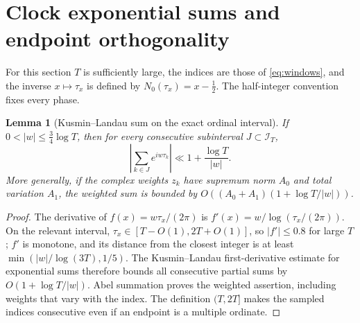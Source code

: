 \documentclass[11pt,reqno]{amsart}
\numberwithin{equation}{section}
\newtheorem{lemma}[theorem]{Lemma}
\begin{document}
\section{Clock exponential sums and endpoint orthogonality}\label{sec:clockorth}
For this section $T$ is sufficiently large, the indices are those of
\eqref{eq:windows}, and the inverse $x\mapsto\tau_x$ is defined by
$N_0(\tau_x)=x-\tfrac12$.  The half-integer convention fixes every phase.

\begin{lemma}[Kusmin--Landau sum on the exact ordinal interval]
\label{lem:klclock}
If $0<|w|\le\tfrac34\log T$, then for every consecutive subinterval
$J\subset\mathcal I_T$,
\begin{equation}\label{eq:klclock}
\left|\sum_{k\in J}e^{iw\tau_k}\right|
 \ll1+\frac{\log T}{|w|}.
\end{equation}
More generally, if the complex weights $z_k$ have supremum norm $A_0$
and total variation $A_1$, the weighted sum is bounded by
$O((A_0+A_1)(1+\log T/|w|))$.
\end{lemma}
\begin{proof}
The derivative of $f(x)=w\tau_x/(2\pi)$ is
$f'(x)=w/\log(\tau_x/(2\pi))$.  On the relevant interval,
$\tau_x\in[T-O(1),2T+O(1)]$, so $|f'|\le0.8$ for large $T$;
$f'$ is monotone, and its distance from the closest integer is at least
$\min(|w|/\log(3T),1/5)$.
The Kusmin--Landau first-derivative estimate for exponential sums
therefore bounds all consecutive partial sums by
$O(1+\log T/|w|)$.  Abel summation proves the weighted assertion,
including weights that vary with the index.  The definition
$(T,2T]$ makes the sampled indices consecutive even if an endpoint
is a multiple ordinate.
\end{proof}
\end{document}
